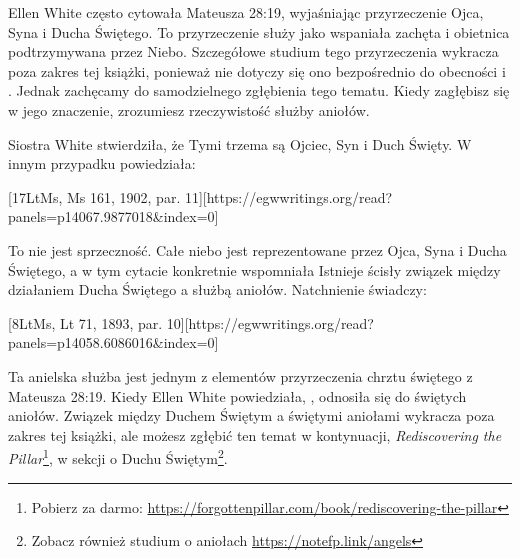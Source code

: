 Ellen White często cytowała Mateusza 28:19, wyjaśniając przyrzeczenie Ojca, Syna i Ducha Świętego. To przyrzeczenie służy jako wspaniała zachęta i obietnica podtrzymywana przez Niebo. Szczegółowe studium tego przyrzeczenia wykracza poza zakres tej książki, ponieważ nie dotyczy się ono bezpośrednio do obecności i . Jednak zachęcamy do samodzielnego zgłębienia tego tematu. Kiedy zagłębisz się w jego znaczenie, zrozumiesz rzeczywistość służby aniołów.

Siostra White stwierdziła, że  Tymi trzema są Ojciec, Syn i Duch Święty. W innym przypadku powiedziała:

[17LtMs, Ms 161, 1902, par. 11][https://egwwritings.org/read?panels=p14067.9877018&index=0]

To nie jest sprzeczność. Całe niebo jest reprezentowane przez Ojca, Syna i Ducha Świętego, a w tym cytacie konkretnie wspomniała  Istnieje ścisły związek między działaniem Ducha Świętego a służbą aniołów. Natchnienie świadczy:

[8LtMs, Lt 71, 1893, par. 10][https://egwwritings.org/read?panels=p14058.6086016&index=0]

Ta anielska służba jest jednym z elementów przyrzeczenia chrztu świętego z Mateusza 28:19. Kiedy Ellen White powiedziała, , odnosiła się do świętych aniołów. Związek między Duchem Świętym a świętymi aniołami wykracza poza zakres tej książki, ale możesz zgłębić ten temat w kontynuacji, \textit{Rediscovering the Pillar}\footnote{Pobierz za darmo: \href{https://forgottenpillar.com/book/rediscovering-the-pillar}{https://forgottenpillar.com/book/rediscovering-the-pillar}}, w sekcji o Duchu Świętym\footnote{Zobacz również studium o aniołach \href{https://notefp.link/angels}{https://notefp.link/angels}}.